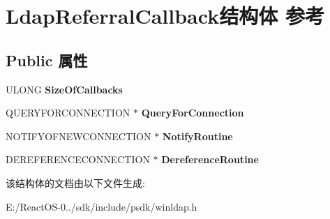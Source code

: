 \hypertarget{struct_ldap_referral_callback}{}\section{Ldap\+Referral\+Callback结构体 参考}
\label{struct_ldap_referral_callback}
\subsection*{Public 属性}
\begin{DoxyCompactItemize}
\item 
\mbox{\label{struct_ldap_referral_callback_a1f55af187857260732662e824b2c9e39}} 
U\+L\+O\+NG {\bfseries Size\+Of\+Callbacks}
\item 
\mbox{\label{struct_ldap_referral_callback_a45aaf32874a4657ee22bf87cee445780}} 
Q\+U\+E\+R\+Y\+F\+O\+R\+C\+O\+N\+N\+E\+C\+T\+I\+ON $\ast$ {\bfseries Query\+For\+Connection}
\item 
\mbox{\label{struct_ldap_referral_callback_a7d30b4b32bbc087d0ae58f54c34bcb23}} 
N\+O\+T\+I\+F\+Y\+O\+F\+N\+E\+W\+C\+O\+N\+N\+E\+C\+T\+I\+ON $\ast$ {\bfseries Notify\+Routine}
\item 
\mbox{\label{struct_ldap_referral_callback_a7f7ac553cccc92df29b4f940684c3e78}} 
D\+E\+R\+E\+F\+E\+R\+E\+N\+C\+E\+C\+O\+N\+N\+E\+C\+T\+I\+ON $\ast$ {\bfseries Dereference\+Routine}
\end{DoxyCompactItemize}


该结构体的文档由以下文件生成\+:\begin{DoxyCompactItemize}
\item 
E\+:/\+React\+O\+S-\/0../sdk/include/psdk/winldap.\+h\end{DoxyCompactItemize}
